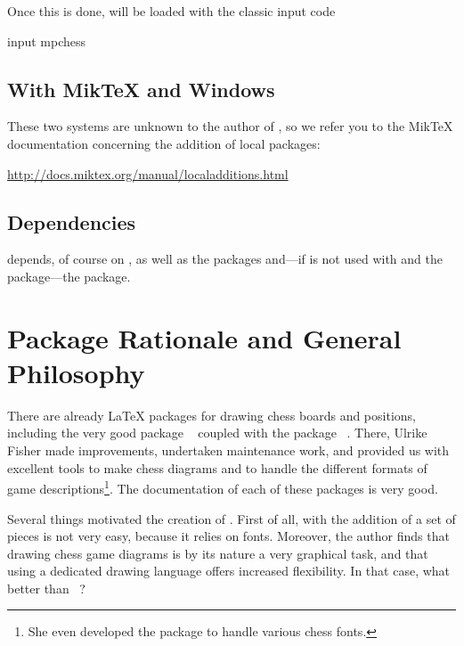 \documentclass[english]{ltxdoc}
\begin{document}
Once this is done, \mpchess will be loaded with the classic \MP{}
input code
\begin{mpcode}
input mpchess
\end{mpcode}

\subsection{With Mik\TeX{} and Windows}

These two systems are unknown to the author of \mpchess, so we
refer you to the Mik\TeX{} documentation concerning the addition of local packages:
\begin{center}
  \url{http://docs.miktex.org/manual/localadditions.html}
\end{center}



\subsection{Dependencies}


\mpchess depends, of course on \MP, as well as the packages 
and---if \mpchess is not used with  and the 
package---the  package.


\section{Package Rationale and General Philosophy}

There are already \LaTeX{} packages for drawing chess boards and positions,
including the very good package ~\cite{ctan-xskak} coupled with
the package ~\cite{ctan-chessboard}. 
There, Ulrike Fisher made improvements, undertaken maintenance work, and provided us with excellent tools to make chess diagrams and to handle the different
formats of
game descriptions\footnote{She even developed the
package to handle various chess fonts.}. The
documentation of each of these packages is very good.

Several things motivated the creation of \mpchess. First of all, with
 the addition of a set of pieces is not very easy, because
it relies on fonts. Moreover, the author finds that drawing chess game diagrams is by its nature a very graphical task, and that using a dedicated drawing
language offers increased flexibility. In that case, what better than \MP~\cite{ctan-metapost}?
\end{document}
